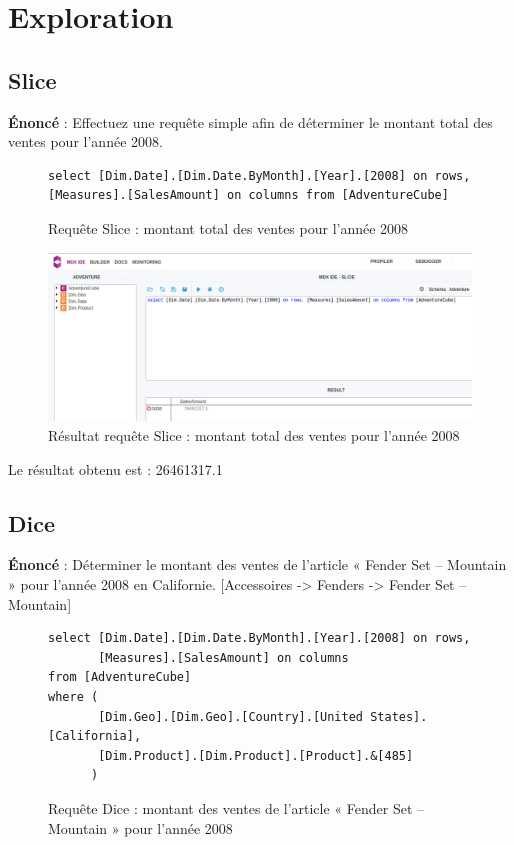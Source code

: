 \chapter{Exploration}

\section{Slice}

\textbf{Énoncé} : Effectuez une requête simple afin de déterminer le montant total des ventes pour l’année 2008.

\begin{figure}[H]
\centering
\begin{lstlisting}
select [Dim.Date].[Dim.Date.ByMonth].[Year].[2008] on rows,
[Measures].[SalesAmount] on columns from [AdventureCube]
\end{lstlisting}
\caption{Requête Slice : montant total des ventes pour l'année 2008}
\label{lst:reqSlice}
\end{figure}

\begin{figure}[H]
    \centering
    \includegraphics[width=1\linewidth, fbox]{img/requeteSlice.png}
    \caption{Résultat requête Slice : montant total des ventes pour l'année 2008}
    \label{reqSliceResult}
\end{figure}

Le résultat obtenu est : 26461317.1

\section{Dice}

\textbf{Énoncé} : Déterminer le montant des ventes de l’article « Fender Set – Mountain » pour l’année 2008 en Californie. [Accessoires -> Fenders -> Fender Set – Mountain]

\begin{figure}[H]
\centering
\begin{lstlisting}
select [Dim.Date].[Dim.Date.ByMonth].[Year].[2008] on rows,
	   [Measures].[SalesAmount] on columns
from [AdventureCube]
where (
	   [Dim.Geo].[Dim.Geo].[Country].[United States].[California],
	   [Dim.Product].[Dim.Product].[Product].&[485]
      )
\end{lstlisting}
\caption{Requête Dice : montant des ventes de l'article « Fender Set – Mountain » pour l'année 2008}
\label{lst:reqDice}
\end{figure}

